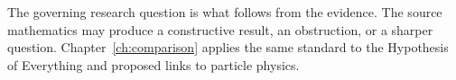 The governing research question is what follows from the evidence. The source mathematics may produce a constructive result, an obstruction, or a sharper question. Chapter~\ref{ch:comparison} applies the same standard to the Hypothesis of Everything and proposed links to particle physics.
